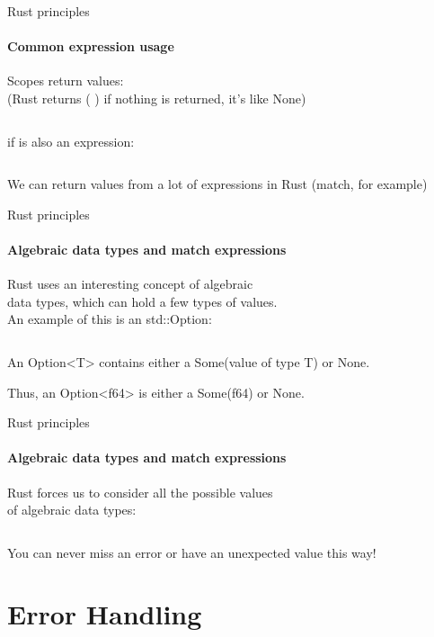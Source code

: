 \documentclass[usenames,dvipsnames,10pt,aspectratio=169]{beamer}
\begin{document}
\begin{frame}{Rust principles}
\framesubtitle{Common expression usage}
Scopes return values:\\
(Rust returns \textcolor{ucuyellow}{( )} if nothing is returned, it's like None)
\inputminted[fontsize=\large]{rust}{code/expression3.rs}
\vspace{0.7cm}
\textcolor{ucuyellow}{if}
is also an expression:
\inputminted[fontsize=\large]{rust}{code/expression4.rs}
\vspace{0.5cm}
We can return values from a lot of expressions in Rust 
(\textcolor{ucuyellow}{match}, for example)
\end{frame}

\begin{frame}{Rust principles}
\framesubtitle{Algebraic data types and match expressions}
\large
Rust uses an interesting concept of algebraic \\
data types, which can hold a few types of values.\\ 
An example of this is an \textcolor{ucuyellow}{std::Option}:\\
\vspace{0.2cm}
\inputminted[fontsize=\large]{rust}{code/option1.rs}
\vspace{0.4cm}
\normalsize
An \textcolor{ucuyellow}{Option<T>}
contains either a \textcolor{ucuyellow}{Some(value of type T)}
or \textcolor{ucuyellow}{None}.

Thus, an \textcolor{ucuyellow}{Option<f64>}
is either a \textcolor{ucuyellow}{Some(f64)}
or \textcolor{ucuyellow}{None}.
\end{frame}

\begin{frame}{Rust principles}
\framesubtitle{Algebraic data types and match expressions}
\large
Rust forces us to consider all the possible values\\
of algebraic data types:
\vspace{0.2cm}
\inputminted[fontsize=\normalsize]{rust}{code/option2.rs}
\vspace{0.4cm}
You can never miss an error or have an unexpected value this way!
\end{frame}


\section{Error Handling}
\end{document}
